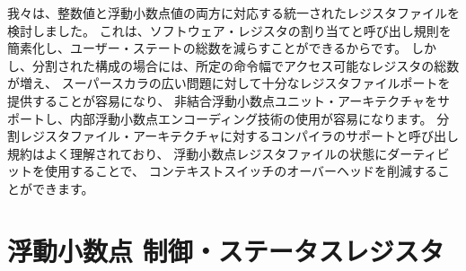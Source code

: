 \begin{commentary}
\begin{comment}
We considered a unified register file for both integer and
floating-point values as this simplifies software register allocation
and calling conventions, and reduces total user state.  However, a
split organization increases the total number of registers accessible
with a given instruction width, simplifies provision of enough regfile
ports for wide superscalar issue, supports decoupled
floating-point-unit architectures, and simplifies use of internal
floating-point encoding techniques.  Compiler support and calling
conventions for split register file architectures are well understood,
and using dirty bits on floating-point register file state can reduce
context-switch overhead.
\end{comment}
我々は、整数値と浮動小数点値の両方に対応する統一されたレジスタファイルを検討しました。
これは、ソフトウェア・レジスタの割り当てと呼び出し規則を簡素化し、ユーザー・ステートの総数を減らすことができるからです。 
しかし、分割された構成の場合には、所定の命令幅でアクセス可能なレジスタの総数が増え、
スーパースカラの広い問題に対して十分なレジスタファイルポートを提供することが容易になり、
非結合浮動小数点ユニット・アーキテクチャをサポートし、内部浮動小数点エンコーディング技術の使用が容易になります。 
分割レジスタファイル・アーキテクチャに対するコンパイラのサポートと呼び出し規約はよく理解されており、
浮動小数点レジスタファイルの状態にダーティビットを使用することで、
コンテキストスイッチのオーバーヘッドを削減することができます。
\end{commentary}

\clearpage

\begin{comment}
\section{Floating-Point Control and Status Register}
\end{comment}
\section{浮動小数点 制御・ステータスレジスタ}

\begin{comment}
The floating-point control and status register, {\tt fcsr}, is a RISC-V
control and status register (CSR).  It is a 32-bit read/write register that
selects the dynamic rounding mode for floating-point arithmetic operations and
holds the accrued exception flags, as shown in Figure~\ref{fcsr}.
\end{comment}

